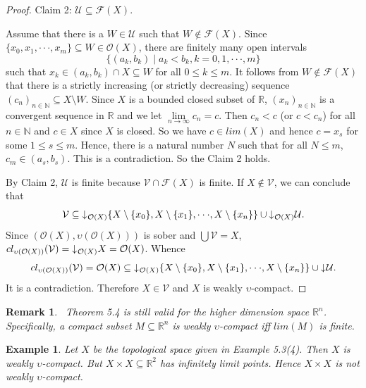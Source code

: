 \documentclass[preprint,12pt]{elsarticle}
\numberwithin{equation}{section}
\newtheorem{remark}[theorem]{Remark}
\newtheorem{example}[theorem]{Example}
\newcommand{\dn}{\mathord{\downarrow}\hspace{0.05em}}
\begin{document}
\begin{proof}
Claim 2:  $\mathcal{U}\subseteq\mathscr{F}(X)$.

Assume that there is a $W\in\mathcal{U}$ such that $W\not\in\mathscr{F}(X)$. Since $\{x_{0},x_{1},\cdot\cdot\cdot,x_{m}\}\subseteq W\in\mathcal{O}(X)$, there are finitely many open intervals $$\{(a_{k},b_{k})\mid a_{k}<b_{k}, k=0,1,\cdot\cdot\cdot,m\}$$ such that $x_{k}\in(a_{k},b_{k})\cap X\subseteq W$ for all $0\leq k\leq m$. It follows from $W\not\in\mathscr{F}(X)$ that there is a strictly increasing (or strictly decreasing) sequence $(c_{n})_{n\in\mathbb{N}}\subseteq X\setminus W$. Since $X$ is a bounded closed subset of $\mathbb{R}$, $(x_{n})_{n\in\mathbb{N}}$ is a convergent sequence in $\mathbb{R}$ and we let $\lim\limits_{n\longrightarrow\infty}c_{n}=c$. Then $c_{n}< c$ (or $c< c_{n}$) for all $n\in \mathbb{N}$ and $c\in X$ since $X$ is closed. So we have $c\in lim(X)$ and hence $c=x_{s}$ for some $1\leq s\leq m$. Hence, there is a natural number $N$ such that for all $N\leq m$, $c_{m}\in(a_{s},b_{s})$. This is a contradiction. So the Claim 2 holds.

By Claim 2, $\mathcal{U}$ is finite because $\mathcal{V}\cap\mathscr{F}(X)$ is finite.  If $X\not\in \mathcal{V}$, we can conclude that $$\mathcal{V}\subseteq \dn_{\mathcal{O}(X)}\{X\setminus\{x_{0}\},X\setminus\{x_{1}\},\cdot\cdot\cdot,X\setminus\{x_{n}\}\}\cup\dn_{\mathcal{O}(X)} \mathcal{U}.$$
Since $(\mathcal{O}(X),\upsilon(\mathcal{O}(X)))$ is sober and $\bigcup\mathcal{V}=X$, $cl_{\upsilon(\mathcal{O}(X))}(\mathcal{V})=\dn_{\mathcal{O}(X)} X=\mathcal{O}(X)$. Whence $$cl_{\upsilon(\mathcal{O}(X))}(\mathcal{V})=\mathcal{O}(X)\subseteq\dn_{\mathcal{O}(X)}\{X\setminus\{x_{0}\},X\setminus\{x_{1}\},\cdot\cdot\cdot,X\setminus\{x_{n}\}\}\cup\dn \mathcal{U}.$$ It is a contradiction. Therefore $X\in\mathcal{V}$ and $X$ is weakly $\upsilon$-compact.\end{proof}

\begin{remark}\ {\rm Theorem 5.4 is still valid for the higher dimension space $\mathbb{R}^{n}$. Specifically, a compact subset $M\subseteq \mathbb{R}^{n}$ is weakly $\upsilon$-compact iff $lim(M)$ is finite.}
\end{remark}

\begin{example} {\rm Let $X$ be the topological space given in Example 5.3(4). Then $X$ is weakly $\upsilon$-compact. But $X\times X\subseteq\mathbb{R}^{2}$ has infinitely limit points. Hence $X\times X$ is not weakly $\upsilon$-compact.}
\end{example}
\end{document}
